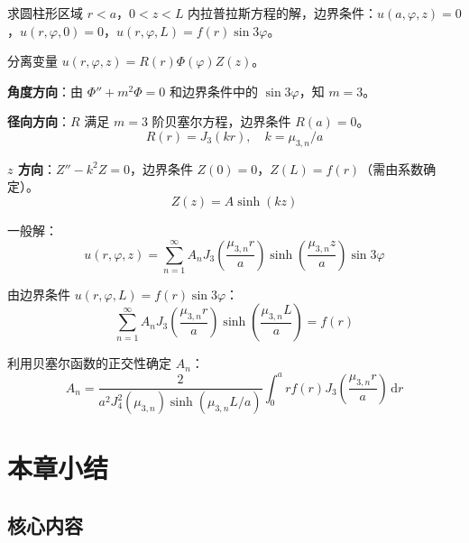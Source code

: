 \begin{lizi}{}{}
求圆柱形区域 $r < a$，$0 < z < L$ 内拉普拉斯方程的解，边界条件：$u(a, \varphi, z) = 0$，$u(r, \varphi, 0) = 0$，$u(r, \varphi, L) = f(r)\sin 3\varphi$。

\begin{jie}
    分离变量 $u(r, \varphi, z) = R(r)\Phi(\varphi)Z(z)$。
    
    \textbf{角度方向}：由 $\Phi'' + m^2\Phi = 0$ 和边界条件中的 $\sin 3\varphi$，知 $m = 3$。
    
    \textbf{径向方向}：$R$ 满足 $m = 3$ 阶贝塞尔方程，边界条件 $R(a) = 0$。
    \begin{equation}
        R(r) = J_3(kr), \quad k = \mu_{3,n}/a
    \end{equation}
    
    \textbf{$z$ 方向}：$Z'' - k^2 Z = 0$，边界条件 $Z(0) = 0$，$Z(L) = f(r)$（需由系数确定）。
    \begin{equation}
        Z(z) = A\sinh(kz)
    \end{equation}
    
    一般解：
    \begin{equation}
        u(r, \varphi, z) = \sum_{n=1}^{\infty} A_n J_3\left(\frac{\mu_{3,n}r}{a}\right)\sinh\left(\frac{\mu_{3,n}z}{a}\right)\sin 3\varphi
    \end{equation}
    
    由边界条件 $u(r, \varphi, L) = f(r)\sin 3\varphi$：
    \begin{equation}
        \sum_{n=1}^{\infty} A_n J_3\left(\frac{\mu_{3,n}r}{a}\right)\sinh\left(\frac{\mu_{3,n}L}{a}\right) = f(r)
    \end{equation}
    
    利用贝塞尔函数的正交性确定 $A_n$：
    \begin{equation}
        A_n = \frac{2}{a^2 J_4^2(\mu_{3,n})\sinh(\mu_{3,n}L/a)}\int_0^a r f(r) J_3\left(\frac{\mu_{3,n}r}{a}\right)\,\mathrm{d}r
    \end{equation}
\end{jie}
\end{lizi}

\section{本章小结}

\subsection{核心内容}

